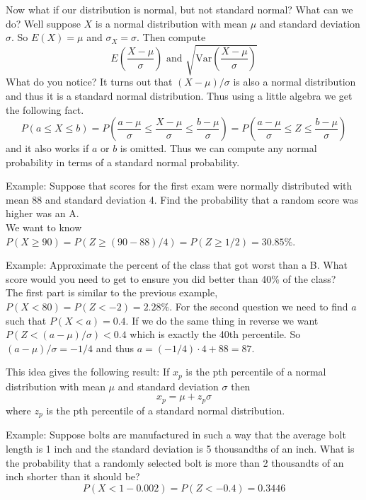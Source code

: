 \documentclass[14,fleqn]{article}
\newcommand{\var}{\ensuremath{\mathrm{Var}}}
\begin{document}
Now what if our distribution is normal, but not standard normal? What can we do? Well suppose $X$ is a normal distribution with mean $\mu$ and standard deviation $\sigma.$ So $E(X)=\mu$ and $\sigma_X=\sigma.$ Then compute
\[
	E\left(\frac{X-\mu}{\sigma}\right)\text{ and }\sqrt{\var(\frac{X-\mu}{\sigma})}
\]
What do you notice? It turns out that $(X-\mu)/\sigma$ is also a normal distribution and thus it is a standard normal distribution. Thus using a little algebra we get the following fact.
\[
	P(a\le X\le b)=P\left(\frac{a-\mu}{\sigma}\le \frac{X-\mu}{\sigma}\le \frac{b-\mu}{\sigma}\right)=P\left(\frac{a-\mu}{\sigma}\le Z\le \frac{b-\mu}{\sigma}\right)
\]
and it also works if $a$ or $b$ is omitted. Thus we can compute any normal probability in terms of a standard normal probability.

Example: Suppose that scores for the first exam were normally distributed with mean 88 and standard deviation 4. Find the probability that a random score was higher was an A.\\
We want to know $P(X\ge 90)=P(Z\ge (90-88)/4)=P(Z\ge 1/2)=30.85\%.$

Example: Approximate the percent of the class that got worst than a B. What score would you need to get to ensure you did better than 40\% of the class?\\

The first part is similar to the previous example, $P(X<80)=P(Z<-2)=2.28\%.$ For the second question we need to find $a$ such that $P(X<a)=0.4.$ If we do the same thing in reverse we want $P(Z<(a-\mu)/\sigma)<0.4$ which is exactly the 40th percentile. So $(a-\mu)/\sigma=-1/4$ and thus $a=(-1/4)\cdot 4+88=87.$

This idea gives the following result: If $x_p$ is the pth percentile of a normal distribution with mean $\mu$ and standard deviation $\sigma$ then\[
	x_p=\mu+z_p\sigma
\]
where $z_p$ is the pth percentile of a standard normal distribution.

Example: Suppose bolts are manufactured in such a way that the average bolt length is 1 inch and the standard deviation is 5 thousandths of an inch. What is the probability that a randomly selected bolt is more than 2 thousandts of an inch shorter than it should be?\\
\[
	P(X<1-0.002)=P(Z<-0.4)=0.3446
\]
\end{document}
